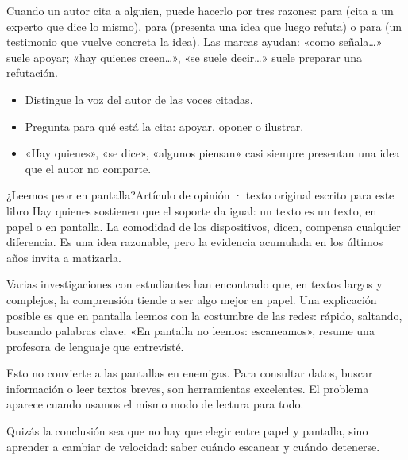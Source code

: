 

Cuando un autor cita a alguien, puede hacerlo por tres razones: para  (cita a un experto que dice lo
mismo), para  (presenta una idea que luego refuta) o para  (un testimonio que vuelve
concreta la idea). Las marcas ayudan: «como señala…» suele apoyar; «hay quienes creen…», «se suele decir…» suele preparar
una refutación.


\begin{regla}
\begin{itemize}
  \item Distingue la voz del autor de las voces citadas.
  \item Pregunta para qué está la cita: apoyar, oponer o ilustrar.
  \item «Hay quienes», «se dice», «algunos piensan» casi siempre presentan una idea que el autor no comparte.
\end{itemize}
\end{regla}

\begin{texto}{¿Leemos peor en pantalla?}{Artículo de opinión · texto original escrito para este libro}
\pa Hay quienes sostienen que el soporte da igual: un texto es un texto, en papel o en pantalla. La comodidad de los
dispositivos, dicen, compensa cualquier diferencia. Es una idea razonable, pero la evidencia acumulada en los últimos
años invita a matizarla.

\pa Varias investigaciones con estudiantes han encontrado que, en textos largos y complejos, la comprensión tiende a ser
algo mejor en papel. Una explicación posible es que en pantalla leemos con la costumbre de las redes: rápido, saltando,
buscando palabras clave. «En pantalla no leemos: escaneamos», resume una profesora de lenguaje que entrevisté.

\pa Esto no convierte a las pantallas en enemigas. Para consultar datos, buscar información o leer textos breves, son
herramientas excelentes. El problema aparece cuando usamos el mismo modo de lectura para todo.

\pa Quizás la conclusión sea que no hay que elegir entre papel y pantalla, sino aprender a cambiar de velocidad: saber
cuándo escanear y cuándo detenerse.
\end{texto}

